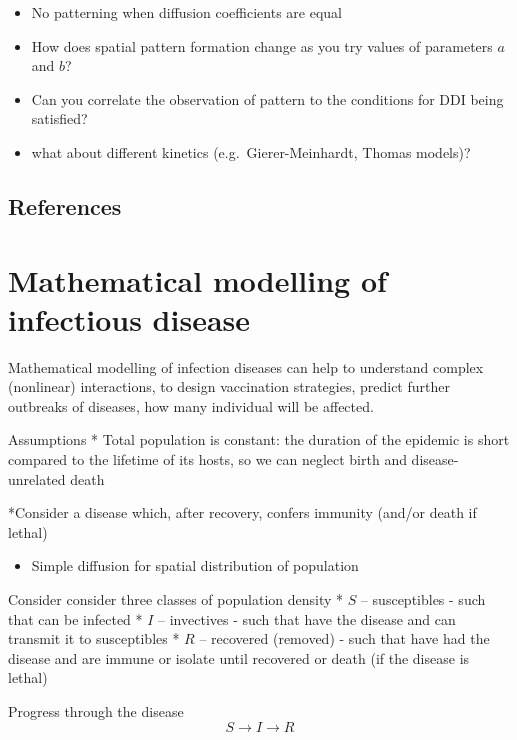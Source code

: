 \documentclass[
  letterpaper,
  DIV=11,
  numbers=noendperiod]{scrreprt}
\providecommand{\tightlist}{%
  \setlength{\itemsep}{0pt}\setlength{\parskip}{0pt}}\usepackage{longtable,booktabs,array}
\theoremstyle{plain}
\theoremstyle{definition}
\theoremstyle{plain}
\theoremstyle{remark}
\begin{document}
\begin{itemize}
\tightlist
\item
  No patterning when diffusion coefficients are equal
\item
  How does spatial pattern formation change as you try values of
  parameters \(a\) and \(b\)?
\item
  Can you correlate the observation of pattern to the conditions for DDI
  being satisfied?
\item
  what about different kinetics (e.g.~Gierer-Meinhardt, Thomas models)?
\end{itemize}

\hypertarget{references-1}{%
\section{References}\label{references-1}}

\hypertarget{mathematical-modelling-of-infectious-disease}{%
\chapter{Mathematical modelling of infectious
disease}\label{mathematical-modelling-of-infectious-disease}}

Mathematical modelling of infection diseases can help to understand
complex (nonlinear) interactions, to design vaccination strategies,
predict further outbreaks of diseases, how many individual will be
affected.

Assumptions * Total population is constant: the duration of the epidemic
is short compared to the lifetime of its hosts, so we can neglect birth
and disease-unrelated death

*Consider a disease which, after recovery, confers immunity (and/or
death if lethal)

\begin{itemize}
\tightlist
\item
  Simple diffusion for spatial distribution of population
\end{itemize}

Consider consider three classes of population density * \(S\) --
susceptibles - such that can be infected * \(I\) -- invectives - such
that have the disease and can transmit it to susceptibles * \(R\) --
recovered (removed) - such that have had the disease and are immune or
isolate until recovered or death (if the disease is lethal)

Progress through the disease \[
S \longrightarrow I \longrightarrow R 
\]
\end{document}
